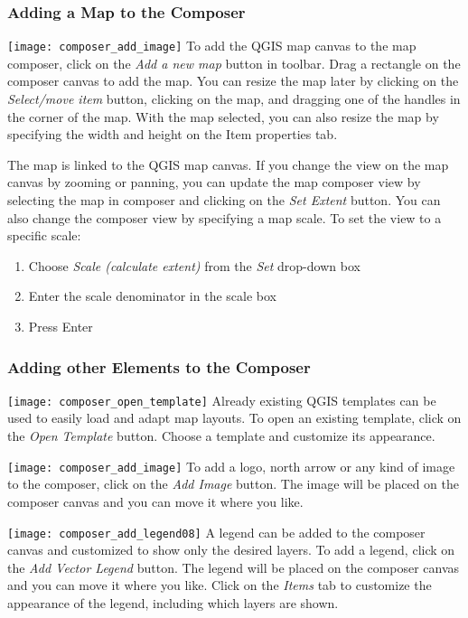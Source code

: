 \subsubsection{Adding a Map to the Composer}

\texttt{[image: composer\_add\_image]} To add
the QGIS map canvas to the map composer, click on the \textit{Add a new
map} button in toolbar. Drag a rectangle on the composer canvas to add the
map. You can resize the map later by clicking on the \textit{Select/move item}
button, clicking on the map, and dragging one of the handles in the corner of
the map. With the map selected, you can also resize the map by specifying the
width and height on the Item properties tab.

The map is linked to the QGIS map canvas. If you change the view on the map
canvas by zooming or panning, you can update the map composer view by
selecting the map in composer and clicking on the \textit{Set Extent} button.
You can also change the composer view by specifying a map scale. To set the
view to a specific scale:

\begin{enumerate}
\item Choose \textit{Scale (calculate extent)} from the \textit{Set} drop-down
box
\item Enter the scale denominator in the scale box
\item Press Enter
\end{enumerate} 

\subsubsection{Adding other Elements to the Composer} 
 
\texttt{[image: composer\_open\_template]} Already existing QGIS templates 
can be used to easily load and adapt map layouts. To open an existing 
template, click on the \textit{Open Template} button. Choose a template and customize 
its appearance. 

\texttt{[image: composer\_add\_image]} To add a logo, north arrow or any 
kind of image to the composer, click on the \textit{Add Image} button. The image will 
be placed on the composer canvas and you can move it where you like. 

\texttt{[image: composer\_add\_legend08]} A
legend can be added to the composer canvas and customized to show only the
desired layers. To add a legend, click on the \textit{Add Vector Legend}
button. The legend will be placed on the composer canvas and you can move it
where you like. Click on the \textit{Items} tab to customize the appearance of
the legend, including which layers are shown.

